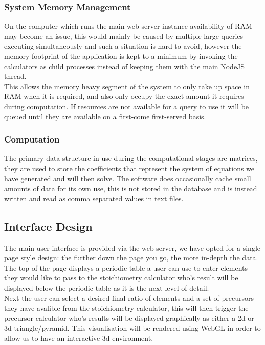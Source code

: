 \subsubsection{System Memory Management}
On the computer which runs the main web server instance availability of RAM may become an issue, this would mainly be caused by multiple large queries executing simultaneously and such a situation is hard to avoid, however the memory footprint of the application is kept to a minimum by invoking the calculators as child processes instead of keeping them with the main NodeJS thread.\\

This allows the memory heavy segment of the system to only take up space in RAM when it is required, and also only occupy the exact amount it requires during computation. If resources are not available for a query to use it will be queued until they are available on a first-come first-served basis. 

\subsubsection{Computation}
The primary data structure in use during the computational stages are matrices, they are used to store the coefficients that represent the system of equations we have generated and will then solve. The software does occasionally cache small amounts of data for its own use, this is not stored in the database and is instead written and read as comma separated values in text files.


\subsection{Interface Design}
The main user interface is provided via the web server, we have opted for a single page style design: the further down the page you go, the more in-depth the data. \\

The top of the page displays a periodic table a user can use to enter elements they would like to pass to the stoichiometry calculator who's result will be displayed below the periodic table as it is the next level of detail.\\

Next the user can select a desired final ratio of elements and a set of precursors they have avalible from the stoichiometry calculator, this will then trigger the precursor calculator who's results will be displayed graphically as either a 2d or 3d triangle/pyramid. This visualisation will be rendered using WebGL in order to allow us to have an interactive 3d environment. \\

